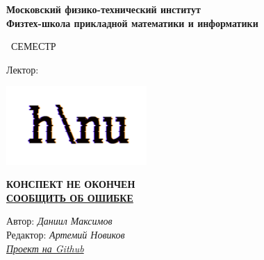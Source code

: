\begin{titlepage}
	\clearpage\thispagestyle{empty}
	\centering
	
	\textbf{Московский физико-технический институт \\ Физтех-школа прикладной математики и информатики}
	\vspace{33ex}
	
	{\textbf{\FullCourseNameFirstPart}}
	
	\SemesterNumber\ СЕМЕСТР  
	\vspace{1ex}
	
	Лектор: \textit{\LecturerInitials}
	
	\includegraphics[width=0.4\textwidth]{images/logo_ltc.png}
	
	{\large \textbf{КОНСПЕКТ НЕ ОКОНЧЕН}
	\\
	\href{https://docs.google.com/forms/d/e/1FAIpQLSd9i-_jq_cDmIt65V_0G8eQYI1gfDlmH16T31zN7TnM2pk8jg/viewform?usp=sf_link}{\textbf{СООБЩИТЬ ОБ ОШИБКЕ}}}

	\begin{flushright}
		\noindent
		Автор: \textit{Даниил Максимов}
		\\
		Редактор: \textit{Артемий Новиков}
		\\
		\href{\GithubLink}{\textit{Проект на Github}}
	\end{flushright}
	
	\vfill
	\CourseDate
	\pagebreak
\end{titlepage}

